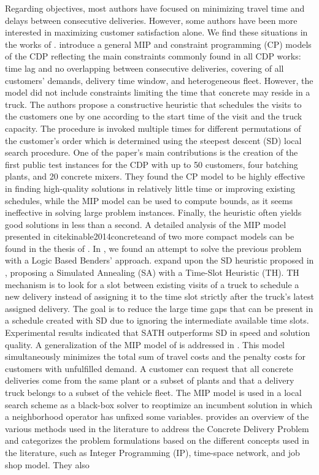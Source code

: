 \documentclass{article}
\begin{document}
Regarding objectives, most authors have focused on minimizing travel time and delays between consecutive deliveries. However, some authors have been more interested in maximizing customer satisfaction alone. We find these situations in the works of \cite{durbin2008or, kinable2014concrete, kinable2014logic, sulaman2017simulated}. \cite{kinable2014concrete} introduce a general MIP and constraint programming (CP) models of the CDP reflecting the main constraints commonly found in all CDP works: time lag and no overlapping between consecutive deliveries, covering of all customers' demands, delivery time window, and heterogeneous fleet. However, the model did not include constraints limiting the time that concrete may reside in a truck. The authors propose a constructive heuristic that schedules the visits to the customers one by one according to the start time of the visit and the truck capacity. The procedure is invoked multiple times for different permutations of the customer's order which is determined using the steepest descent (SD) local search procedure. One of the paper's main contributions is the creation of the first public test instances for the CDP with up to 50 customers, four batching plants, and 20 concrete mixers. They found the CP model to be highly effective in finding high-quality solutions in relatively little time or improving existing schedules, while the MIP model can be used to compute bounds, as it seems ineffective in solving large problem instances. Finally, the heuristic often yields good solutions in less than a second. A detailed analysis of the MIP model presented in cite{kinable2014concrete}and of two more compact models can be found in the thesis of \cite{hernandez_lopez_study_2020}. In \cite{kinable2014logic}, we found an attempt to solve the previous problem with a Logic Based Benders' approach. \cite{sulaman2017simulated} expand upon the SD heuristic proposed in \cite{kinable2014concrete}, proposing a Simulated Annealing (SA) with a Time-Slot Heuristic (TH). TH mechanism is to look for a slot between existing visits of a truck to schedule a new delivery instead of assigning it to the time slot strictly after the truck's latest assigned delivery. The goal is to reduce the large time gaps that can be present in a schedule created with SD due to ignoring the intermediate available time slots. Experimental results indicated that SATH outperforms SD in speed and solution quality. A generalization of the MIP model of \cite{kinable2014concrete} is addressed in \cite{asbach2009analysis}. This model simultaneously minimizes the total sum of travel costs and the penalty costs for customers with unfulfilled demand. A customer can request that all concrete deliveries come from the same plant or a subset of plants and that a delivery truck belongs to a subset of the vehicle fleet. The MIP model is used in a local search scheme as a black-box solver to reoptimize an incumbent solution in which a neighborhood operator has unfixed some variables. \cite{tzanetos2023systematic} provides an overview of the various methods used in the literature to address the Concrete Delivery Problem and categorizes the problem formulations based on the different concepts used in the literature, such as Integer Programming (IP), time-space network, and job shop model. They also 
\end{document}
